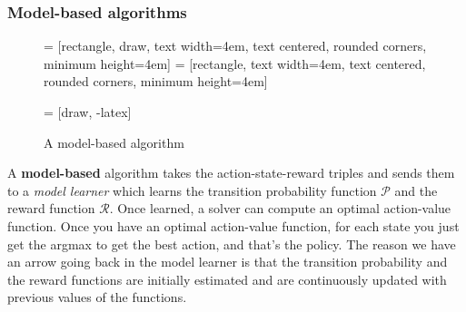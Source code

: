 \subsubsection{Model-based algorithms}
\begin{figure} [ht]
     = [rectangle, draw, 
        text width=4em, text centered, rounded corners, minimum height=4em]
     = [rectangle, 
        text width=4em, text centered, rounded corners, minimum height=4em]
        
     = [draw, -latex]
    \centering
    \caption{A model-based algorithm}
    \label{fig:model-based}
\end{figure}
\noindent
A \textbf{model-based} algorithm takes the action-state-reward triples and sends them to a \textit{model learner} which learns the transition probability function $\mathcal{P}$ and the reward function $\mathcal{R}$. Once learned, a solver can compute an optimal action-value function. Once you have an optimal action-value function, for each state you just get the argmax to get the best action, and that's the policy.
The reason we have an arrow going back in the model learner is that the transition probability and the reward functions are initially estimated and are continuously updated with previous values of the functions.

